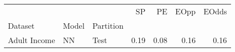\begin{tabular}{lllrrrr}
\toprule
             &    &      &    SP &    PE &  EOpp &  EOdds \\
Dataset & Model & Partition &       &       &       &        \\
\midrule
Adult Income & NN & Test &  0.19 &  0.08 &  0.16 &   0.16 \\
\bottomrule
\end{tabular}

